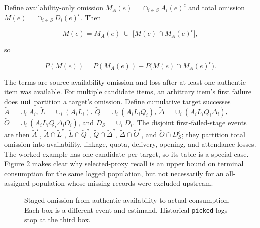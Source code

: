 \documentclass[
  11pt]{article}
\begin{document}
Define availability-only omission \(M_A(e)=\cap_{i\in S}A_i(e)^c\) and
total omission \(M(e)=\cap_{i\in S}D_i(e)^c\). Then

\[M(e)=M_A(e)\;\dot\cup\;\big[M(e)\cap M_A(e)^c\big],\]

so

\[P(M(e))=P(M_A(e))+P\big(M(e)\cap M_A(e)^c\big).\]

The terms are source-availability omission and loss after at least one
authentic item was available. For multiple candidate items, an arbitrary
item's first failure does \textbf{not} partition a target's omission.
Define cumulative target successes \(\widetilde A=\cup_iA_i\),
\(\widetilde L=\cup_i(A_iL_i)\), \(\widetilde Q=\cup_i(A_iL_iQ_i)\),
\(\widetilde\Delta=\cup_i(A_iL_iQ_i\Delta_i)\),
\(\widetilde O=\cup_i(A_iL_iQ_i\Delta_iO_i)\), and \(D_S=\cup_iD_i\).
The disjoint first-failed-stage events are then \(\widetilde A^c\),
\(\widetilde A\cap\widetilde L^c\), \(\widetilde L\cap\widetilde Q^c\),
\(\widetilde Q\cap\widetilde\Delta^c\),
\(\widetilde\Delta\cap\widetilde O^c\), and \(\widetilde O\cap D_S^c\);
they partition total omission into availability, linkage, quota,
delivery, opening, and attendance losses. The worked example has one
candidate per target, so its table is a special case. Figure 2 makes
clear why selected-proxy recall is an upper bound on terminal
consumption for the same logged population, but not necessarily for an
all-assigned population whose missing records were excluded upstream.

\begin{figure}[htbp]
\centering
{}
\caption{Staged omission from authentic availability to actual consumption. Each box is a different event and estimand. Historical \texttt{picked} logs stop at the third box.}
\label{fig:omission-stages}
\end{figure}
\end{document}
